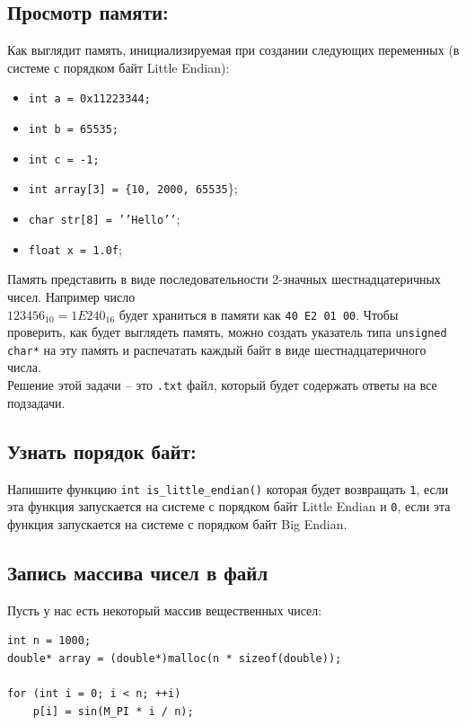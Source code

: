 \documentclass{article}
\begin{document}
\subsection{Просмотр памяти:}
Как выглядит память, инициализируемая при создании следующих переменных (в системе с порядком байт Little Endian):
\begin{itemize}
\item \texttt{int a = 0x11223344;}
\item \texttt{int b = 65535;}
\item \texttt{int c = -1;}
\item \texttt{int array[3] = \{10, 2000, 65535}\};
\item \texttt{char str[8] = '{}'Hello'{}'};
\item \texttt{float x = 1.0f};
\end{itemize}
Память представить в виде последовательности 2-значных шестнадцатеричных чисел. Например число \\
$123456_{10} = 1E240_{16}$ будет храниться в памяти как \texttt{40 E2 01 00}. Чтобы проверить, как будет выглядеть память, можно создать указатель типа \texttt{unsigned char*} на эту память и распечатать каждый байт в виде шестнадцатеричного числа.\\

Решение этой задачи -- это \texttt{.txt} файл, который будет содержать ответы на все подзадачи.

\subsection{Узнать порядок байт:}
Напишите функцию \texttt{int is\_little\_endian()} которая будет возвращать \texttt{1}, если эта функция запускается на системе с порядком байт Little Endian и \texttt{0}, если эта функция запускается на системе с порядком байт Big Endian.




\subsection{Запись массива чисел в файл}
Пусть у нас есть некоторый массив вещественных чисел:
\begin{lstlisting}
int n = 1000;
double* array = (double*)malloc(n * sizeof(double));

for (int i = 0; i < n; ++i)
    p[i] = sin(M_PI * i / n);
\end{lstlisting}
\end{document}
